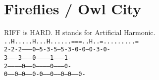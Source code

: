 \section{Fireflies / Owl City}\label{ch:fireflies}
\Gmajor
\Cmajor
\Fmajor
\Gmajor
\EminorSeven
\GsusFour

RIFF is HARD. H stands for Artificial Harmonic.\\

\texttt{..H.....H...H......===..H..=.........=}\\
\texttt{2-2-2---------0---5-3-5---5-3-0-0---0-3-0-}\\
\texttt{3-------3---------0-----------1---------1-}\\
\texttt{2-----------0-----0-----------0---------0-}\\
\texttt{0-----0---0-----0-0-----0-----0---0-----0-}\\


